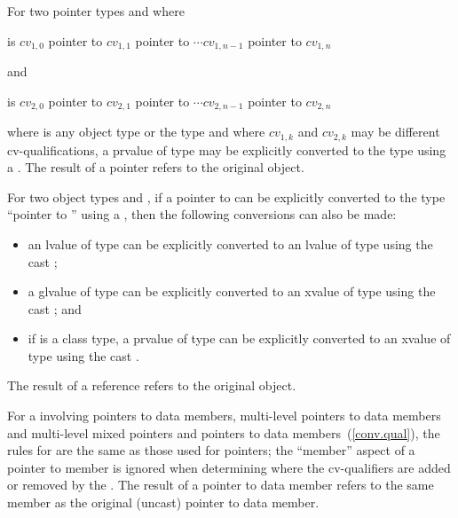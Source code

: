 \pnum
For two pointer types  and  where

\begin{indented}
 is $\mathit{cv}_{1,0}$ pointer to $\mathit{cv}_{1,1}$ pointer
to $\cdots \mathit{cv}_{1,n-1}$ pointer to $\mathit{cv}_{1,n}$ 
\end{indented}

and

\begin{indented}
 is $\mathit{cv}_{2,0}$ pointer to $\mathit{cv}_{2,1}$ pointer
to $\cdots \mathit{cv}_{2,n-1}$ pointer to $\mathit{cv}_{2,n}$ 
\end{indented}

where
 is any object type or the  type and where
$\mathit{cv}_{1,k}$ and $\mathit{cv}_{2,k}$ may be different
cv-qualifications, a prvalue of type  may be explicitly
converted to the type  using a . The result
of a pointer  refers to the original object.

\pnum
For two object types  and , if a pointer to  can
be explicitly converted to the type ``pointer to '' using a
, then the following conversions can also be made:

\begin{itemize}
\item an lvalue of type  can be explicitly converted to an lvalue
of type  using the cast ;

\item a glvalue of type  can be explicitly converted to an xvalue
of type  using the cast ; and

\item if  is a class type, a prvalue of type  can be
explicitly converted to an xvalue of type  using the cast
.
\end{itemize}

The result of a reference  refers
to the original object.

\pnum
For a  involving pointers to data members, multi-level
pointers to data members and multi-level mixed pointers and pointers to
data members~(\ref{conv.qual}), the rules for  are the
same as those used for pointers; the ``member'' aspect of a pointer to
member is ignored when determining where the cv-qualifiers are added or
removed by the . The result of a pointer to data
member  refers to the same member as the original
(uncast) pointer to data member.

